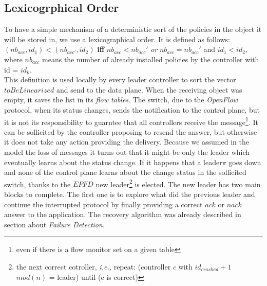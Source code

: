 \documentclass{article}
\theoremstyle{remark}
\begin{document}
\subsection{Lexicogrphical Order}
To have a simple mechanism of a deterministic sort of the policies in the object it will be stored in, we use a lexicographical order.
It is defined as follows:\\
$(nb_{acc}, id_1 )<(nb_{acc'}, id_2)$  \textbf{iff}  $nb_{acc} < nb_{acc}'  $ \emph{or} $nb_{acc} = nb_{acc}'$ and $id_1<id_2$, where $nb_{acc}$ means the number of already installed policies by the controller with id = $id_k$.\\
This definition is used locally by every leader controller to sort the vector $toBeLinearized$ and send to the data plane. When the receiving object was empty, it saves the list in its \emph{flow tables}. The switch, due to the \emph{OpenFlow} protocol, when its status changes, sends the notification to the control plane, but it is not its responsibility to guarntee that all controllers receive the message\footnote{even if there is a flow monitor set on a given table}. It can be sollicited by the controller proposing to resend the answer, but otherwise it does not take any action providing the delivery. Because we assumed in the model the loss of messages it turns out that it might be only the leader which eventually learns about the status change.
If it happens that a leader$\pi$ goes down and none of the control plane learns about the change status in the sollicited switch, thanks to the $EPFD$ new leader\footnote{the next correct cotroller, \emph{i.e.,} repeat: (controller $c$ with $id_{crashed}+1$ $mod(n)$ = leader) until (c is correct) } is elected.
The new leader has two main blocks to complete. The first one is to explore what did the previous leader and continue the interrupted protocol by finally providing a correct $ack$ or $nack$ answer to the application. The recovery algorithm was already described in section about \emph{Failure Detection}. \\
 
\end{document}

